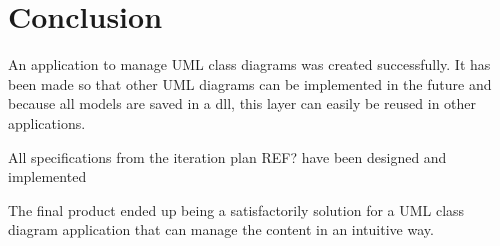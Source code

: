 \chapter{Conclusion}
An application to manage UML class diagrams was created successfully. It has been made so that other UML diagrams can be implemented in the future and because all models are saved in a dll, this layer can easily be reused in other applications.

All specifications from the iteration plan REF? have been designed and implemented

The final product ended up being a satisfactorily solution for a UML class diagram application that can manage the content in an intuitive way.